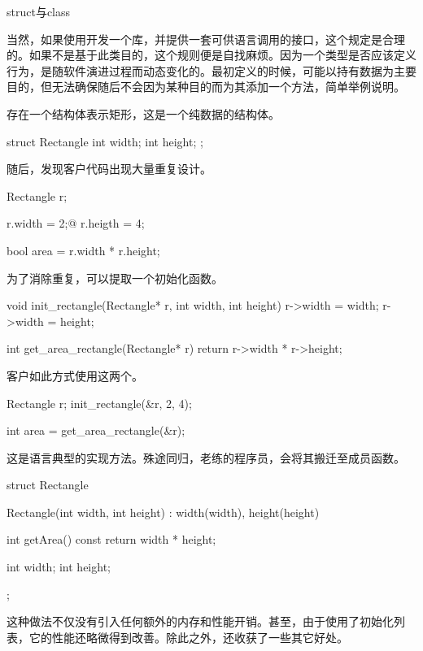 \begin{content}
\begin{episode}{struct与class}
\begin{content}
当然，如果使用\cpp{}开发一个库，并提供一套可供\clang{}语言调用的接口，这个规定是合理的。如果不是基于此类目的，这个规则便是自找麻烦。因为一个类型是否应该定义行为，是随软件演进过程而动态变化的。最初定义的时候，可能以持有数据为主要目的，但无法确保随后不会因为某种目的而为其添加一个方法，简单举例说明。

存在一个结构体表示矩形，这是一个纯数据的结构体。

\begin{c++}
struct Rectangle {
  int width;
  int height;
};
\end{c++}

随后，发现客户代码出现大量重复设计。

\begin{c++}
Rectangle r;

r.width = 2;@
r.heigth = 4;

bool area = r.width * r.height;
\end{c++}

为了消除重复，可以提取一个初始化函数。

\begin{c++}
void init_rectangle(Rectangle* r, int width, int height) {
  r->width = width;
  r->width = height;
}

int get_area_rectangle(Rectangle* r) {
  return r->width * r->height;
}
\end{c++}

客户如此方式使用这两个。

\begin{c++}
Rectangle r;
init_rectangle(&r, 2, 4);

int area = get_area_rectangle(&r);
\end{c++}

这是\clang{}语言典型的实现方法。殊途同归，老练的程序员，会将其搬迁至成员函数。

\begin{c++}
struct Rectangle {
  Rectangle(int width, int height) : width(width), height(height) {
  }

  int getArea() const {
    return width * height;
  }

  int width;
  int height;
};
\end{c++}

这种做法不仅没有引入任何额外的内存和性能开销。甚至，由于使用了初始化列表，它的性能还略微得到改善。除此之外，还收获了一些其它好处。

\begin{enum}
\end{enum}


\end{content}
\end{episode}
\end{content}
